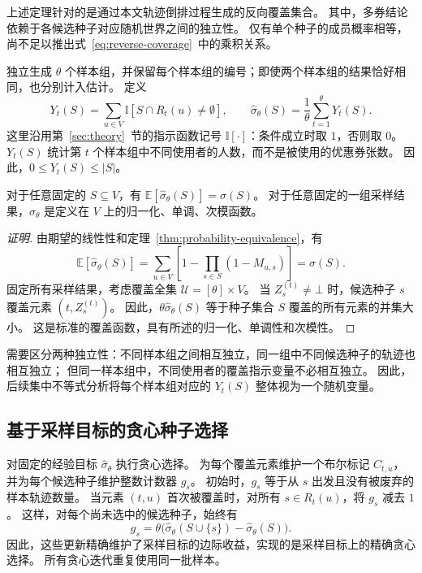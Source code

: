 上述定理针对的是通过本文轨迹倒排过程生成的反向覆盖集合。
其中，多券结论依赖于各候选种子对应随机世界之间的独立性。
仅有单个种子的成员概率相等，尚不足以推出式~\eqref{eq:reverse-coverage}~中的乘积关系。

独立生成 $\theta$ 个样本组，并保留每个样本组的编号；即使两个样本组的结果恰好相同，也分别计入估计。
定义
\begin{equation}
\label{eq:empirical-spread}
 Y_t(S)=\sum_{u\in V}\mathbb{I}[S\cap R_t(u)\ne\emptyset],
 \qquad
 \hat\sigma_\theta(S)=\frac1\theta\sum_{t=1}^\theta Y_t(S).
\end{equation}
这里沿用第~\ref{sec:theory}~节的指示函数记号 $\mathbb{I}[\cdot]$：条件成立时取 $1$，否则取 $0$。
$Y_t(S)$ 统计第 $t$ 个样本组中不同使用者的人数，而不是被使用的优惠券张数。
因此，$0\le Y_t(S)\le |S|$。

\begin{lemma}[无偏性与经验目标的次模性]
\label{lem:unbiased}
对于任意固定的 $S\subseteq V$，有
$\mathbb E[\hat\sigma_\theta(S)]=\sigma(S)$。
对于任意固定的一组采样结果，$\hat\sigma_\theta$ 是定义在 $V$ 上的归一化、单调、次模函数。
\end{lemma}
\begin{proof}[证明]\renewcommand{\qedsymbol}{}
由期望的线性性和定理~\ref{thm:probability-equivalence}，有
\[
 \mathbb E[\hat\sigma_\theta(S)]
 =\sum_{u\in V}\left[1-\prod_{s\in S}(1-M_{u,s})\right]
 =\sigma(S).
\]
固定所有采样结果，考虑覆盖全集 $\mathcal U=[\theta]\times V$。
当 $Z_s^{(t)}\ne\bot$ 时，候选种子 $s$ 覆盖元素 $(t,Z_s^{(t)})$。
因此，$\theta\hat\sigma_\theta(S)$ 等于种子集合 $S$ 覆盖的所有元素的并集大小。
这是标准的覆盖函数，具有所述的归一化、单调性和次模性。
\end{proof}

需要区分两种独立性：不同样本组之间相互独立，同一组中不同候选种子的轨迹也相互独立；
但同一样本组中，不同使用者的覆盖指示变量不必相互独立。
因此，后续集中不等式分析将每个样本组对应的 $Y_t(S)$ 整体视为一个随机变量。

\subsection{基于采样目标的贪心种子选择}
\label{sec:greedy-selection}

对固定的经验目标 $\hat\sigma_\theta$ 执行贪心选择。
为每个覆盖元素维护一个布尔标记 $C_{t,u}$，并为每个候选种子维护整数计数器 $g_s$。
初始时，$g_s$ 等于从 $s$ 出发且没有被废弃的样本轨迹数量。
当元素 $(t,u)$ 首次被覆盖时，对所有 $s\in R_t(u)$，将 $g_s$ 减去 $1$。
这样，对每个尚未选中的候选种子，始终有
\[
 g_s=\theta\bigl(\hat\sigma_\theta(S\cup\{s\})
                       -\hat\sigma_\theta(S)\bigr).
\]
因此，这些更新精确维护了采样目标的边际收益，实现的是采样目标上的精确贪心选择。
所有贪心迭代重复使用同一批样本。

